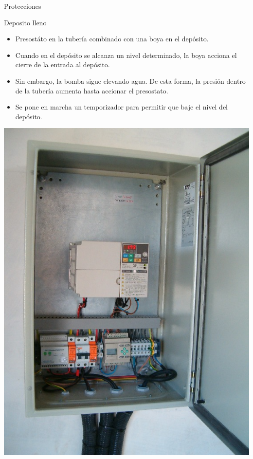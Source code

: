 \documentclass[xcolor={usenames,svgnames,dvipsnames}]{beamer}
\begin{document}
\begin{frame}[label=sec-3-0-5]{Protecciones}
\begin{block}{Deposito lleno}
\begin{itemize}
\item \alert{Presostáto en la tubería combinado con una boya en el depósito}.

\item Cuando en el depósito se alcanza un nivel determinado, la boya acciona el cierre de la entrada al depósito.

\item Sin embargo, la bomba sigue elevando agua. De esta forma, la presión dentro de la tubería aumenta hasta accionar el presostato.

\item Se pone en marcha un temporizador para permitir que baje el nivel del depósito.
\end{itemize}
\end{block}
\end{frame}



\begin{frame}[label=sec-3-0-6]{}
\includegraphics[height=0.9\textheight]{../figs/VariadorFrecuencia.jpg}
\end{frame}
\end{document}
